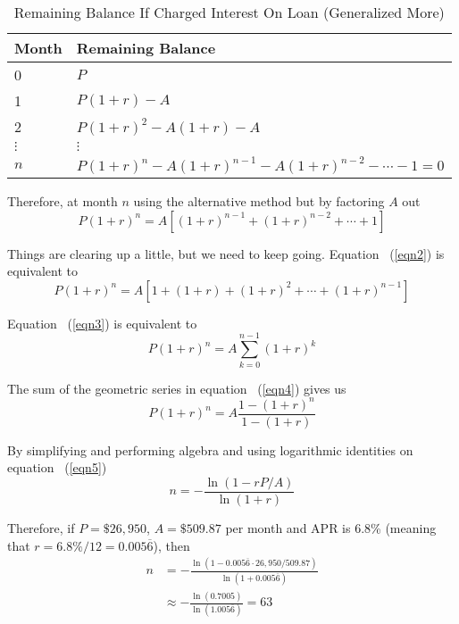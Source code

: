 \documentclass[12pt,letterpaper]{amsart}
\theoremstyle{definition} %
\begin{document}
\begin{table}[ht]\caption{Remaining Balance If Charged Interest On Loan (Generalized More)}\begin{tabular}[center]{l|l}
\hline\hline
Month			&	Remaining Balance\\
\hline
0				&	$P$\\
1				&	$P(1+r)-A$\\
2				&	$P(1+r)^2-A(1+r)-A$\\
$\vdots$	&	$\vdots$\\
$n$			&	$P(1+r)^n-A(1+r)^{n-1}-A(1+r)^{n-2}-\cdots -1=0$\\
\hline\end{tabular}\end{table}

\par Therefore, at month $n$ using the alternative method but by factoring $A$ out
\begin{equation}\label{eqn2}P(1+r)^n=A\left[(1+r)^{n-1}+(1+r)^{n-2}+\cdots +1\right]\end{equation}

\par Things are clearing up a little, but we need to keep going. Equation ~(\ref{eqn2}) is equivalent to
\begin{equation}\label{eqn3}P(1+r)^n=A\left[1+(1+r)+(1+r)^2+\cdots+(1+r)^{n-1}\right]\end{equation}

\par Equation ~(\ref{eqn3}) is equivalent to 
\begin{equation}\label{eqn4}P(1+r)^n=A\sum_{k=0}^{n-1}(1+r)^k\end{equation}

\par The sum of the geometric series in equation ~(\ref{eqn4}) gives us
\begin{equation}\label{eqn5}P(1+r)^n=A\frac{1-(1+r)^n}{1-(1+r)}\end{equation}

\par By simplifying and performing algebra and using logarithmic identities on equation ~(\ref{eqn5})
\begin{equation*}\boxed{n=-\frac{\ln{(1-rP/A)}}{\ln{(1+r)}}}\end{equation*}

\par Therefore, if $P=\$26,950$, $A=\$509.87$ per month and APR is 6.8\% (meaning that $r=6.8\%/12=0.005\overline{6}$), then
\begin{align*}n&=-\frac{\ln{(1-0.005\overline{6}\cdot 26,950/509.87)}}{\ln{(1+0.005\overline{6})}}\\
&\approx-\frac{\ln{(0.7005)}}{\ln{(1.005\overline{6})}}=63\end{align*} %
\end{document}
